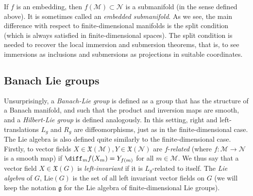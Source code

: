 If \(f\) is an embedding, then \(f(\mathcal{M}) \subset \mathcal{N}\) is a submanifold (in the sense defined above). It is sometimes called an \textit{embedded submanifold}. As we see, the main difference with respect to finite-dimensional manifolds is the split condition (which is always satisfied in finite-dimensional spaces). The split condition is needed to recover the local immersion and submersion theorems, that is, to see immersions as inclusions and submersions as projections in suitable coordinates. 

\subsection{Banach Lie groups}
Unsurprisingly, a \textit{Banach-Lie group} is defined as a group that has the structure of a Banach manifold, and such that the product and inversion maps are smooth, and a \textit{Hilbert-Lie group} is defined analogously. In this setting, right and left-translations \(L_g\) and \(R_g\) are diffeomorphisms, just as in the finite-dimensional case. The Lie algebra is also defined quite similarly to the finite-dimensional case. Firstly, to vector fields \(X \in \mathfrak{X}(\mathcal{M}), Y \in \mathfrak{X}(\mathcal{N})\) are \(f\)-\textit{related} (where \(f\colon \mathcal{M}\to \mathcal{N}\) is a smooth map) if \(\diff_mf(X_m)=Y_{f(m)}\) for all \(m \in \mathcal{M} \). We thus say that a vector field \(X \in \mathfrak{X}(G)\) is \textit{left-invariant} if it is \(L_g\)-related to itself. The \textit{Lie algebra} of \(G\), \(\mathrm{Lie}(G)\) is the set of all left invariant vector fields on \(G\) (we will keep the notation \(\mathfrak{g}\) for the Lie algebra of finite-dimensional Lie groups).

